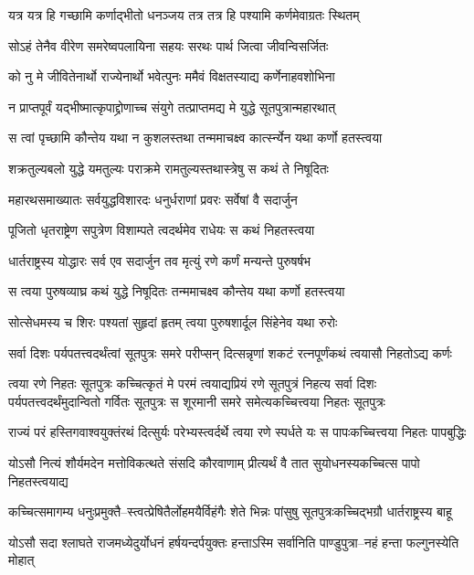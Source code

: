 \twolineshloka
{यत्र यत्र हि गच्छामि कर्णाद्भीतो धनञ्जय}
{तत्र तत्र हि पश्यामि कर्णमेवाग्रतः स्थितम्}


\twolineshloka
{सोऽहं तेनैव वीरेण समरेष्वपलायिना}
{सहयः सरथः पार्थ जित्वा जीवन्विसर्जितः}


\twolineshloka
{को नु मे जीवितेनार्थो राज्येनार्थो भवेत्पुनः}
{ममैवं विक्षतस्याद्य कर्णेनाहवशोभिना}


\twolineshloka
{न प्राप्तपूर्वं यद्भीष्मात्कृपाद्द्रोणाच्च संयुगे}
{तत्प्राप्तमद्य मे युद्धे सूतपुत्रान्महारथात्}


\twolineshloka
{स त्वां पृच्छामि कौन्तेय यथा न कुशलस्तथा}
{तन्ममाचक्ष्व कार्त्स्न्येन यथा कर्णो हतस्त्वया}


\twolineshloka
{शक्रतुल्यबलो युद्धे यमतुल्यः पराक्रमे}
{रामतुल्यस्तथास्त्रेषु स कथं ते निषूदितः}


\twolineshloka
{महारथसमाख्यातः सर्वयुद्धविशारदः}
{धनुर्धराणां प्रवरः सर्वेषां वै सदार्जुन}


\twolineshloka
{पूजितो धृतराष्ट्रेण सपुत्रेण विशाम्पते}
{त्वदर्थमेव राधेयः स कथं निहतस्त्वया}


\twolineshloka
{धार्तराष्ट्रस्य योद्धारः सर्व एव सदार्जुन}
{तव मृत्युं रणे कर्णं मन्यन्ते पुरुषर्षभ}


\twolineshloka
{स त्वया पुरुषव्याघ्र कथं युद्धे निषूदितः}
{तन्ममाचक्ष्व कौन्तेय यथा कर्णो हतस्त्वया}


\twolineshloka
{सोत्सेधमस्य च शिरः पश्यतां सुहृदां हृतम्}
{त्वया पुरुषशार्दूल सिंहेनेव यथा रुरोः}


\twolineshloka
{सर्वा दिशः पर्यपतत्त्वदर्थंत्वां सूतपुत्रः समरे परीप्सन्}
{दित्सन्नृणां शकटं रत्नपूर्णंकथं त्वयासौ निहतोऽद्य कर्णः}


त्वया रणे निहतः सूतपुत्रः कच्चित्कृतं मे परमं त्वयाद्यप्रियं रणे सूतपुत्रं निहत्य
\twolineshloka
{सर्वा दिशः पर्यपतत्त्वदर्थंमुदान्वितो गर्वितः सूतपुत्रः}
{स शूरमानी समरे समेत्यकच्चित्त्वया निहतः सूतपुत्रः}


\twolineshloka
{राज्यं परं हस्तिगवाश्वयुक्तंरथं दित्सुर्यः परेभ्यस्त्वर्दर्थे}
{त्वया रणे स्पर्धते यः स पापःकच्चित्त्वया निहतः पापबुद्धिः}


\twolineshloka
{योऽसौ नित्यं शौर्यमदेन मत्तोविकत्थते संसदि कौरवाणाम्}
{प्रीत्यर्थं वै तात सुयोधनस्यकच्चित्स पापो निहतस्त्वयाद्य}


\twolineshloka
{कच्चित्समागम्य धनुःप्रमुक्तै--स्त्वत्प्रेषितैर्लोहमयैर्विहंगैः}
{शेते भिन्नः पांसुषु सूतपुत्रःकच्चिद्भग्रौ धार्तराष्ट्रस्य बाहू}


\twolineshloka
{योऽसौ सदा श्लाघते राजमध्येदुर्योधनं हर्षयन्दर्पयुक्तः}
{हन्ताऽस्मि सर्वानिति पाण्डुपुत्रा--नहं हन्ता फल्गुनस्येति मोहात्}


